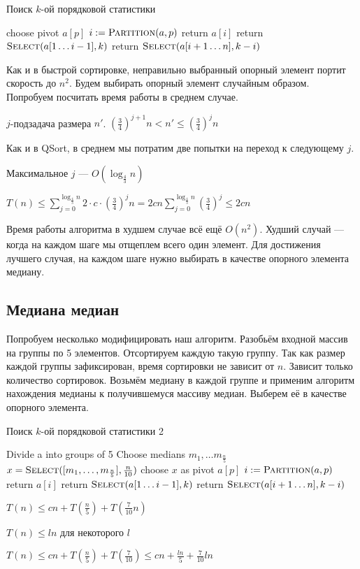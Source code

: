 \begin{algorithm}
\caption{Поиск $k$-ой порядковой статистики}
\begin{algorithmic}[1]
	\State choose pivot $a[p]$
	\State $i \mathrel{:=} \textsc{Partition}(a, p)$
		\State return $a[i]$	
	\EndIf
		\State return $\textsc{Select}(a[1 \ldots i - 1], k)$
	\Else
		\State return $\textsc{Select}(a[i + 1 \ldots n], k - i)$
	\EndIf
\EndFunction
\end{algorithmic}
\end{algorithm}

Как и в быстрой сортировке, неправильно выбранный опорный элемент портит скорость до $n^2$. Будем выбирать опорный элемент случайным образом. Попробуем посчитать время работы в среднем случае.

$j$-подзадача размера $n'$. $\left( \frac{3}{4} \right)^{j+1}n < n' \leqslant \left( \frac{3}{4} \right)^{j}n$

Как и в QSort, в среднем мы потратим две попытки на переход к следующему $j$.

Максимальное $j$ --- $O(\log_\frac{4}{3} n)$

$T(n) \leqslant \sum\limits_{j=0}^{\log_{\frac{4}{3}}n} 2\cdot c\cdot \left( \frac{3}{4} \right)^jn = 2cn\sum\limits_{j=0}^{\log_{\frac{4}{3}}n}\left( \frac{3}{4} \right)^j \leqslant 2cn$

Время работы алгоритма в худшем случае всё ещё $O(n^2)$.
Худший случай — когда на каждом шаге мы отщеплем всего один элемент.
Для достижения лучшего случая, на каждом шаге нужно выбирать в качестве опорного элемента медиану.

\subsection*{Медиана медиан}
Попробуем несколько модифицировать наш алгоритм.
Разобьём входной массив на группы по 5 элементов.
Отсортируем каждую такую группу.
Так как размер каждой группы зафиксирован, время сортировки не зависит от $n$.
Зависит только количество сортировок.
Возьмём медиану в каждой группе и применим алгоритм нахождения медианы к получившемуся массиву медиан.
Выберем её в качестве опорного элемента.

\begin{algorithm}
\caption{Поиск $k$-ой порядковой статистики 2}
\begin{algorithmic}[1]
	\State Divide a into groups of 5
	\State Choose medians $m_1,\ldots m_\frac{n}{5}$
	\State $x = \textsc{Select}([m_1,\ldots, m_\frac{n}{5}], \frac{n}{10})$
	\State choose $x$ as pivot $a[p]$
	\State $i \mathrel{:=} \textsc{Partition}(a, p)$
		\State return $a[i]$	
	\EndIf	
		\State return $\textsc{Select}(a[1 \ldots i - 1], k)$
	\Else
		\State return $\textsc{Select}(a[i + 1 \ldots n], k - i)$
	\EndIf
\EndFunction
\end{algorithmic}
\end{algorithm}

$T(n) \leqslant cn + T\left(\frac{n}{5}\right) + T\left( \frac{7}{10}n \right)$

$T(n) \leqslant ln$ для некоторого $l$

$T(n) \leqslant cn + T(\frac{n}{5}) + T(\frac{7}{10}) \leqslant cn + \frac{ln}{5} + \frac{7}{10}ln$

